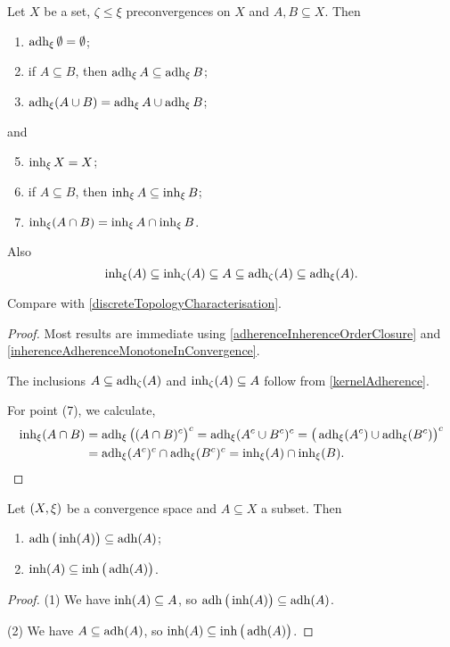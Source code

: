 \begin{corollary} \label{principalInherenceAdherenceProperties}
Let $X$ be a set, $\zeta\leq \xi$ preconvergences on $X$ and $A,B \subseteq X$. Then
\begin{enumerate}
\item $\operatorname{adh}_\xi \emptyset = \emptyset$;
\item if $A \subseteq B$, then $\operatorname{adh}_\xi A \subseteq \operatorname{adh}_\xi B$;
\item $\operatorname{adh}_\xi(A\cup B) = \operatorname{adh}_\xi A \cup \operatorname{adh}_\xi B$;
\end{enumerate}
and
\begin{enumerate} \setcounter{enumi}{4}
\item $\operatorname{inh}_\xi X = X$;
\item if $A \subseteq B$, then $\operatorname{inh}_\xi A \subseteq \operatorname{inh}_\xi B$;
\item $\operatorname{inh}_\xi(A\cap B) = \operatorname{inh}_\xi A \cap \operatorname{inh}_\xi B$.
\end{enumerate}
Also
\[ \operatorname{inh}_\xi(A) \subseteq \operatorname{inh}_\zeta(A) \subseteq A \subseteq \operatorname{adh}_\zeta(A) \subseteq \operatorname{adh}_\xi(A). \]
\end{corollary}
Compare with \ref{discreteTopologyCharacterisation}.
\begin{proof}
Most results are immediate using \ref{adherenceInherenceOrderClosure} and \ref{inherenceAdherenceMonotoneInConvergence}.

The inclusions $A \subseteq \operatorname{adh}_\zeta(A)$ and $\operatorname{inh}_\zeta(A) \subseteq A$ follow from \ref{kernelAdherence}.

For point (7), we calculate,
\begin{align*}
\operatorname{inh}_\xi(A\cap B) &= \operatorname{adh}_\xi\big((A\cap B)^c\big)^c = \operatorname{adh}_\xi(A^c\cup B^c)^c = \big(\operatorname{adh}_\xi(A^c)\cup \operatorname{adh}_\xi(B^c)\big)^c \\
&= \operatorname{adh}_\xi(A^c)^c\cap \operatorname{adh}_\xi(B^c)^c = \operatorname{inh}_\xi(A) \cap \operatorname{inh}_\xi(B).
\end{align*}
\end{proof}
\begin{corollary} \label{interleavedAdherenceInherenceInclusion}
Let $\sSet{X,\xi}$ be a convergence space and $A\subseteq X$ a subset. Then
\begin{enumerate}
\item $\operatorname{adh}\big(\operatorname{inh}(A)\big)\subseteq \operatorname{adh}(A)$;
\item $\operatorname{inh}(A) \subseteq \operatorname{inh}\big(\operatorname{adh}(A)\big)$.
\end{enumerate}
\end{corollary}
\begin{proof}
(1) We have $\operatorname{inh}(A)\subseteq A$, so $\operatorname{adh}\big(\operatorname{inh}(A)\big)\subseteq \operatorname{adh}(A)$.

(2) We have $A\subseteq \operatorname{adh}(A)$, so $\operatorname{inh}(A) \subseteq \operatorname{inh}\big(\operatorname{adh}(A)\big)$.
\end{proof}


